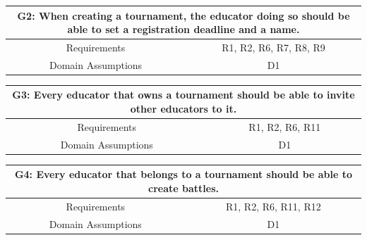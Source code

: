 \documentclass{article}
\begin{document}
\begin{table}[H]
    \centering
    \begin{tabular*}{\linewidth}{@{\extracolsep{\fill}} cc }
        \hline
        \multicolumn{2}{|c|}{\parbox{0.9\dimexpr\textwidth-2\tabcolsep\relax}{\centering\textbf{G2: When creating a tournament, the educator doing so should be able to set a registration deadline and a name.}}} \\
        \hline
        Requirements & R1, R2, R6, R7, R8, R9 \\
        \hline
        Domain Assumptions & D1\\
        \hline
    \end{tabular*}
\end{table}

\begin{table}[H]
    \centering
    \begin{tabular*}{\linewidth}{@{\extracolsep{\fill}} cc }
        \hline
        \multicolumn{2}{|c|}{\parbox{0.9\dimexpr\textwidth-2\tabcolsep\relax}{\centering\textbf{G3: Every educator that owns a tournament should be able to invite other educators to it.}}} \\
        \hline
        Requirements & R1, R2, R6, R11\\
        \hline
        Domain Assumptions & D1\\
        \hline
    \end{tabular*}
\end{table}

\begin{table}[H]
    \centering
    \begin{tabular*}{\linewidth}{@{\extracolsep{\fill}} cc }
        \hline
        \multicolumn{2}{|c|}{\parbox{0.9\dimexpr\textwidth-2\tabcolsep\relax}{\centering\textbf{G4: Every educator that belongs to a tournament should be able to create battles.}}} \\
        \hline
        Requirements & R1, R2, R6, R11, R12\\
        \hline
        Domain Assumptions & D1\\
        \hline
    \end{tabular*}
\end{table}
\end{document}
